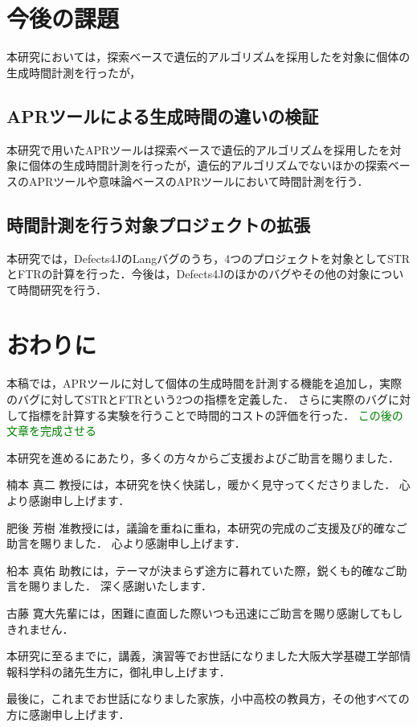 \documentclass[uplatex,dvipdfmx,a4paper]{jsarticle}
\newcommand{\TODO}[1]{{\textcolor{green}{#1}}}
\begin{document}
\section{今後の課題}\label{sec:ftrclg}
本研究においては，探索ベースで遺伝的アルゴリズムを採用した\kgp を対象に個体の生成時間計測を行ったが，
\subsection{APRツールによる生成時間の違いの検証}
本研究で用いたAPRツールは探索ベースで遺伝的アルゴリズムを採用した\kgp を対象に個体の生成時間計測を行ったが，遺伝的アルゴリズムでないほかの探索ベースのAPRツールや意味論ベースのAPRツールにおいて時間計測を行う．
\subsection{時間計測を行う対象プロジェクトの拡張}
本研究では，Defects4JのLangバグのうち，4つのプロジェクトを対象としてSTRとFTRの計算を行った．今後は，Defects4Jのほかのバグやその他の対象について時間研究を行う．
\clearpage
\section{おわりに}\label{sec:concl}
本稿では，APRツールに対して個体の生成時間を計測する機能を追加し，実際のバグに対してSTRとFTRという2つの指標を定義した．
さらに実際のバグに対して指標を計算する実験を行うことで時間的コストの評価を行った．
\TODO{この後の文章を完成させる}
\clearpage
\acknowledgement

本研究を進めるにあたり，多くの方々からご支援およびご助言を賜りました．

楠本 真二 教授には，本研究を快く快諾し，暖かく見守ってくださりました．
心より感謝申し上げます．

肥後 芳樹 准教授には，議論を重ねに重ね，本研究の完成のご支援及び的確なご助言を賜りました．
心より感謝申し上げます．

柗本 真佑 助教には，テーマが決まらず途方に暮れていた際，鋭くも的確なご助言を賜りました．
深く感謝いたします．

古藤 寛大先輩には，困難に直面した際いつも迅速にご助言を賜り感謝してもしきれません．

本研究に至るまでに，講義，演習等でお世話になりました大阪大学基礎工学部情報科学科の諸先生方に，御礼申し上げます．

最後に，これまでお世話になりました家族，小中高校の教員方，その他すべての方に感謝申し上げます．
\clearpage


\end{document}
